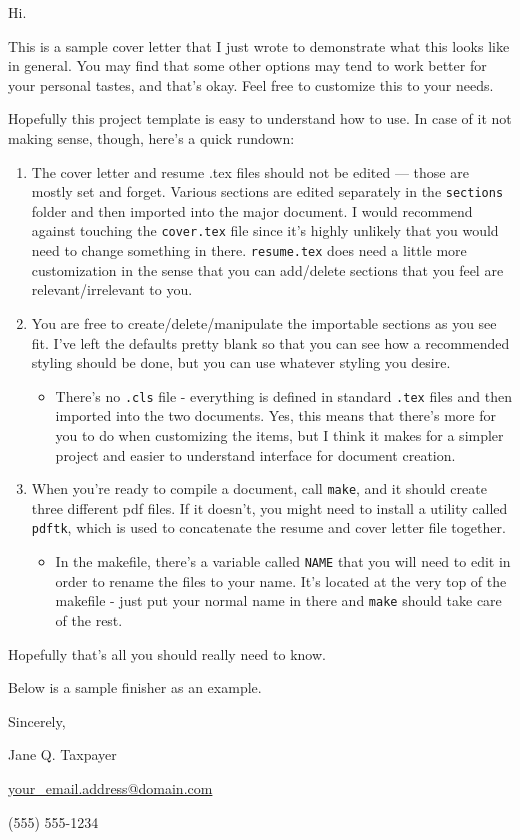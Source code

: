 \documentclass[class=article, crop=false]{standalone}
\makeatletter
\newcommand{\email}{your\_email.address@domain.com}
\makeatother
\begin{document}
Hi.

This is a sample cover letter that I just wrote to demonstrate what this looks 
like in general. You may find that some other options may tend to work better 
for your personal tastes, and that's okay. Feel free to customize this to your 
needs.

Hopefully this project template is easy to understand how to use. In case of 
it not making sense, though, here's a quick rundown:
\begin{enumerate}
    \item The cover letter and resume .tex files should not be edited --- those 
          are mostly set and forget. Various sections are edited separately in 
          the \verb|sections| folder and then imported into the major document.
          I would recommend against touching the \verb|cover.tex| file since 
          it's highly unlikely that you would need to change something in there.
          \verb|resume.tex| does need a little more customization in the sense 
          that you can add/delete sections that you feel are relevant/irrelevant 
          to you.
    
    \item You are free to create/delete/manipulate the importable sections as you 
          see fit. I've left the defaults pretty blank so that you can see how 
          a recommended styling should be done, but you can use whatever styling
          you desire.

    \begin{itemize}
         \item There's no \verb|.cls| file - everything is defined in standard 
          \verb|.tex| files and then imported into the two documents. Yes, this 
          means that there's more for you to do when customizing the items, but 
          I think it makes for a simpler project and easier to understand 
          interface for document creation.
    \end{itemize}

    \item When you're ready to compile a document, call \verb|make|, and it 
          should create three different pdf files. If it doesn't, you might need
          to install a utility called \verb|pdftk|, which is used to concatenate 
          the resume and cover letter file together.

    \begin{itemize}
        \item In the makefile, there's a variable called \verb|NAME| that you 
        will need to edit in order to rename the files to your name. It's 
        located at the very top of the makefile - just put your normal name in 
        there and \verb|make| should take care of the rest.
    \end{itemize}
\end{enumerate}

Hopefully that's all you should really need to know. 

Below is a sample finisher as an example.



\vspace{5mm}

Sincerely, 

Jane Q. Taxpayer

\href{mailto:\email}{\email}

(555) 555-1234
\end{document}
